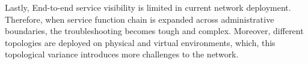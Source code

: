Lastly, End-to-end service visibility is limited in current network deployment. Therefore, when service function chain is expanded across administrative boundaries, the troubleshooting becomes tough and complex. Moreover, different topologies are deployed on physical and virtual environments, which, this topological variance introduces more challenges to the network.

